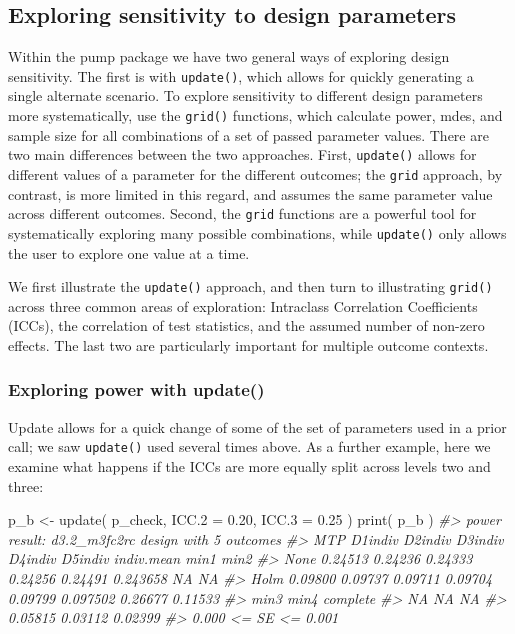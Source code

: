 \documentclass[
]{article}
\newenvironment{Shaded}{\begin{snugshade}}{\end{snugshade}}
\newcommand{\AttributeTok}[1]{\textcolor[rgb]{0.77,0.63,0.00}{#1}}
\newcommand{\CommentTok}[1]{\textcolor[rgb]{0.56,0.35,0.01}{\textit{#1}}}
\newcommand{\FloatTok}[1]{\textcolor[rgb]{0.00,0.00,0.81}{#1}}
\newcommand{\FunctionTok}[1]{\textcolor[rgb]{0.00,0.00,0.00}{#1}}
\newcommand{\NormalTok}[1]{#1}
\newcommand{\OtherTok}[1]{\textcolor[rgb]{0.56,0.35,0.01}{#1}}
\begin{document}
\subsection{Exploring sensitivity to design parameters}

Within the pump package we have two general ways of exploring design
sensitivity. The first is with \texttt{update()}, which allows for
quickly generating a single alternate scenario. To explore sensitivity
to different design parameters more systematically, use the
\texttt{grid()} functions, which calculate power, mdes, and sample size
for all combinations of a set of passed parameter values. There are two
main differences between the two approaches. First, \texttt{update()}
allows for different values of a parameter for the different outcomes;
the \texttt{grid} approach, by contrast, is more limited in this regard,
and assumes the same parameter value across different outcomes. Second,
the \texttt{grid} functions are a powerful tool for systematically
exploring many possible combinations, while \texttt{update()} only
allows the user to explore one value at a time.

We first illustrate the \texttt{update()} approach, and then turn to
illustrating \texttt{grid()} across three common areas of exploration:
Intraclass Correlation Coefficients (ICCs), the correlation of test
statistics, and the assumed number of non-zero effects. The last two are
particularly important for multiple outcome contexts.

\subsubsection{Exploring power with update()}

Update allows for a quick change of some of the set of parameters used
in a prior call; we saw \texttt{update()} used several times above. As a
further example, here we examine what happens if the ICCs are more
equally split across levels two and three:

\begin{Shaded}
\begin{Highlighting}[]
\NormalTok{p\_b }\OtherTok{\textless{}{-}} \FunctionTok{update}\NormalTok{( p\_check, }\AttributeTok{ICC.2 =} \FloatTok{0.20}\NormalTok{, }\AttributeTok{ICC.3 =} \FloatTok{0.25}\NormalTok{ )}
\FunctionTok{print}\NormalTok{( p\_b )}
\CommentTok{\#\textgreater{} power result: d3.2\_m3fc2rc design with 5 outcomes}
\CommentTok{\#\textgreater{}   MTP D1indiv D2indiv D3indiv D4indiv D5indiv indiv.mean    min1    min2}
\CommentTok{\#\textgreater{}  None 0.24513 0.24236 0.24333 0.24256 0.24491   0.243658      NA      NA}
\CommentTok{\#\textgreater{}  Holm 0.09800 0.09737 0.09711 0.09704 0.09799   0.097502 0.26677 0.11533}
\CommentTok{\#\textgreater{}     min3    min4 complete}
\CommentTok{\#\textgreater{}       NA      NA       NA}
\CommentTok{\#\textgreater{}  0.05815 0.03112  0.02399}
\CommentTok{\#\textgreater{}  0.000 \textless{}= SE \textless{}= 0.001}
\end{Highlighting}
\end{Shaded}
\end{document}
